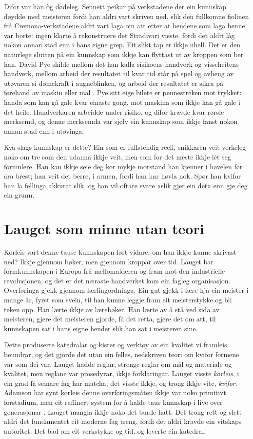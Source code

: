 Difor var han òg dødeleg. Sennett peikar på verkstadene der ein kunnskap døydde med meisteren fordi han aldri vart skriven ned, slik den fullkomne fiolinen frå Cremona-verkstadene aldri vart laga om att etter at hendene som laga henne var borte: ingen klarte å rekonstruere det Stradivari visste, fordi det aldri låg nokon annan stad enn i hans eigne grep. Eit slikt tap er ikkje uhell. Det er den naturlege slutten på ein kunnskap som ikkje kan flyttast ut av kroppen som ber han. David Pye skilde mellom det han kalla risikoens handverk og visseheitens handverk, mellom arbeid der resultatet til kvar tid står på spel og avheng av utøvaren si dømekraft i augneblinken, og arbeid der resultatet er sikra på førehand av maskin eller mal \autocite{pye1968}. Pye sitt eige bilete er pennestreken mot trykket: handa som kan gå gale kvar einaste gong, mot maskina som ikkje kan gå gale i det heile. Handverkaren arbeidde under risiko, og difor kravde kvar rørsle merksemd, og denne merksemda var sjølv ein kunnskap som ikkje fanst nokon annan stad enn i utøvinga.

Kva slags kunnskap er dette? Ein som er fullstendig reell, snikkaren veit verkeleg noko om tre som den udanna ikkje veit, men som for det meste ikkje lèt seg formulere. Han kan ikkje seie deg kor mykje motstand han kjenner i høvelen før åra brest; han veit det berre, i armen, fordi han har høvla nok. Spør han kvifor han la fellinga akkurat slik, og han vil oftare svare «slik gjer ein det» enn gje deg ein grunn.

\section{Lauget som minne utan teori}

Korleis vart denne tause kunnskapen ført vidare, om han ikkje kunne skrivast ned? Ikkje gjennom bøker, men gjennom kroppar over tid. Lauget bar formkunnskapen i Europa frå mellomalderen og fram mot den industrielle revolusjonen, og det er det næraste handverket kom ein fagleg organisasjon. Overføringa gjekk gjennom lærlingordninga. Ein gut gjekk i lære hjå ein meister i mange år, fyrst som svein, til han kunne leggje fram eit meisterstykke og bli teken opp. Han lærte ikkje av lærebøker. Han lærte av å stå ved sida av meisteren, gjere det meisteren gjorde, få det retta, gjere det om att, til kunnskapen sat i hans eigne hender slik han sat i meisteren sine.

Dette produserte katedralar og kister og verktøy av ein kvalitet vi framleis beundrar, og det gjorde det utan ein felles, nedskriven teori om kvifor formene var som dei var. Lauget hadde reglar, strenge reglar om mål og materiale og kvalitet, men reglane var prosedyrar, ikkje forklaringar. Lauget visste \emph{korleis}, i ein grad få seinare fag har matcha; det visste ikkje, og trong ikkje vite, \emph{kvifor}. Adamson har synt korleis denne overføringsmåten ikkje var noko primitivt forstadium, men eit raffinert system for å halde taus kunnskap i live over generasjonar \autocite{adamson2007craft}. Lauget mangla ikkje noko det burde hatt. Det trong rett og slett aldri det fundamentet eit moderne fag treng, fordi det aldri kravde ein vitskaps autoritet. Det bad om eit verkstykke og tid, og leverte ein katedral.

